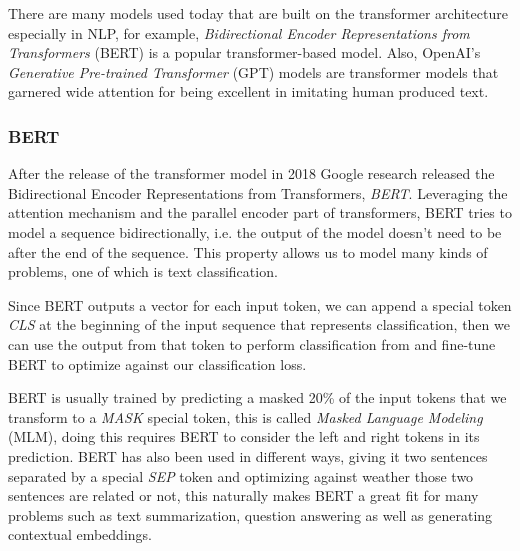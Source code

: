 \documentclass[12pt]{diazessay}
\newcounter{subsubsubsection}[subsubsection]
\begin{document}
        There are many models used today that are built on the transformer architecture especially in NLP, for example, \emph{Bidirectional Encoder Representations from Transformers} (BERT) is a popular transformer-based model. Also, OpenAI's \emph{Generative Pre-trained Transformer} (GPT) models are transformer models that garnered wide attention for being excellent in imitating human produced text.
        
        \subsubsection{BERT}
            
        After the release of the transformer model in 2018 Google research released the Bidirectional Encoder Representations from Transformers, \emph{BERT}. Leveraging the attention mechanism and the parallel encoder part of transformers, BERT tries to model a sequence bidirectionally, i.e. the output of the model doesn't need to be after the end of the sequence. This property allows us to model many kinds of problems, one of which is text classification.\cite{BERT}
            
            Since BERT outputs a vector for each input token, we can append a special token \emph{CLS} at the beginning of the input sequence that represents classification, then we can use the output from that token to perform classification from and fine-tune BERT to optimize against our classification loss. 
            
            BERT is usually trained by predicting a masked 20\% of the input tokens that we transform to a \emph{MASK} special token, this is called \emph{Masked Language Modeling} (MLM), doing this requires BERT to consider the left and right tokens in its prediction.
            BERT has also been used in different ways, giving it two sentences separated by a special \emph{SEP} token and optimizing against weather those two sentences are related or not, this naturally makes BERT a great fit for many problems such as text summarization, question answering as well as generating contextual embeddings.\cite{BERT}
            
            
\end{document}

